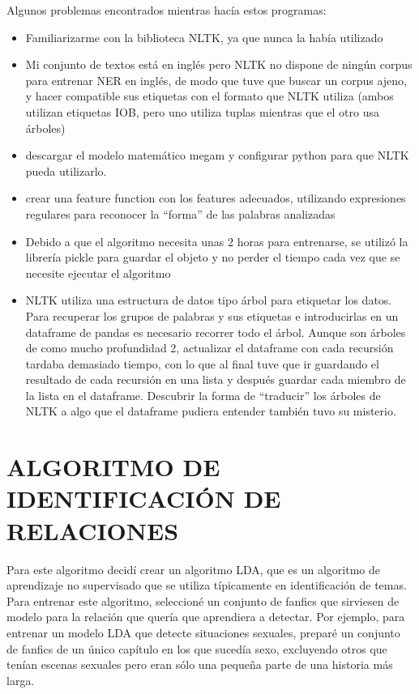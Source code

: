 \documentclass{pre-tfg}
\begin{document}
Algunos problemas encontrados mientras hacía estos programas:
\begin{itemize}
	\item Familiarizarme con la biblioteca NLTK, ya que nunca la había utilizado
	\item Mi conjunto de textos está en inglés pero NLTK no dispone de ningún corpus para entrenar NER en inglés, de modo que tuve que buscar un corpus ajeno, y hacer compatible sus etiquetas con el formato que NLTK utiliza (ambos utilizan etiquetas IOB, pero uno utiliza tuplas mientras que el otro usa árboles)
	\item descargar el modelo matemático megam y configurar python para que NLTK pueda utilizarlo.
	\item crear una feature function con los features adecuados, utilizando expresiones regulares para reconocer la “forma” de las palabras analizadas
	\item Debido a que el algoritmo necesita unas 2 horas para entrenarse, se utilizó la librería pickle para guardar el objeto y no perder el tiempo cada vez que se necesite ejecutar el algoritmo
	\item NLTK utiliza una estructura de datos tipo árbol para etiquetar los datos. Para recuperar los grupos de palabras y sus etiquetas e introducirlas en un dataframe de pandas es necesario recorrer todo el árbol. Aunque son árboles de como mucho profundidad 2, actualizar el dataframe con cada recursión tardaba demasiado tiempo, con lo que al final tuve que ir guardando el resultado de cada recursión en una lista y después guardar cada miembro de la lista en el dataframe. Descubrir la forma de “traducir” los árboles de NLTK a algo que el dataframe pudiera entender también tuvo su misterio.
\end{itemize}

\section{ALGORITMO DE IDENTIFICACIÓN DE RELACIONES}

Para este algoritmo decidí crear un algoritmo LDA, que es un algoritmo de aprendizaje no supervisado que se utiliza típicamente en identificación de temas. Para entrenar este algoritmo, seleccioné un conjunto de fanfics que sirviesen de modelo para la relación que quería que aprendiera a detectar. Por ejemplo, para entrenar un modelo LDA que detecte situaciones sexuales, preparé un conjunto de fanfics de un único capítulo en los que sucedía sexo, excluyendo otros que tenían escenas sexuales pero eran sólo una pequeña parte de una historia más larga. 
\end{document}
